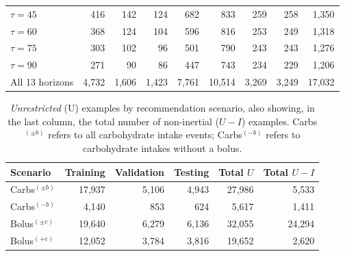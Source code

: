 \documentclass[journal,article,submit,moreauthors,pdftex]{Definitions/mdpi}
\begin{document}
\begin{table}[ht]
\begin{center}
\begin{tabular}{|l|rrrr|rrrr|}
    $\tau=45$ & 416 & 142 & 124 & 682 & 833 & 259 & 258 & 1,350\\
    $\tau=60$ & 368 & 124 & 104 & 596 & 816 & 253 & 249 & 1,318\\
    $\tau=75$ & 303 & 102 & 96 & 501 & 790 & 243 & 243 & 1,276\\
    $\tau=90$ & 271 & 90 & 86 & 447 & 743 & 234 & 229 & 1,206\\
    All 13 horizons & 4,732 & 1,606 & 1,423 & 7,761 & 10,514 & 3,269 & 3,249 & 17,032\\
    \hline
    
\end{tabular}
\end{center}
\end{table}

\begin{table}[ht]\setlength{\tabcolsep}{4pt}
\begin{center}
\caption{{\it Unrestricted} (U) examples by recommendation scenario,  also showing, in the last column, the total number of non-inertial ($U - I$) examples. Carbs$^{(\pm b)}$ refers to all carbohydrate intake events; Carbs$^{(-b)}$ refers to carbohydrate intakes without a bolus.}
\label{tab:c2_examples}
\begin{tabular}{|l|rrrr|r|}
	\hline
	Scenario & Training & Validation & Testing & Total $U$ & Total $U - I$\\
	\hline
	Carbs$^{(\pm b)}$ & 17,937 & 5,106 & 4,943 & 27,986 & 5,533\\
	Carbs$^{(-b)}$  & 4,140 & 853 & 624 & 5,617 & 1,411\\
	Bolus$^{(\pm c)}$ & 19,640 & 6,279 & 6,136 & 32,055 & 24,294\\
	Bolus$^{(+c)}$ & 12,052 & 3,784 & 3,816 & 19,652 & 2,620\\
	\hline
\end{tabular}
\end{center}
\end{table}
\end{document}
